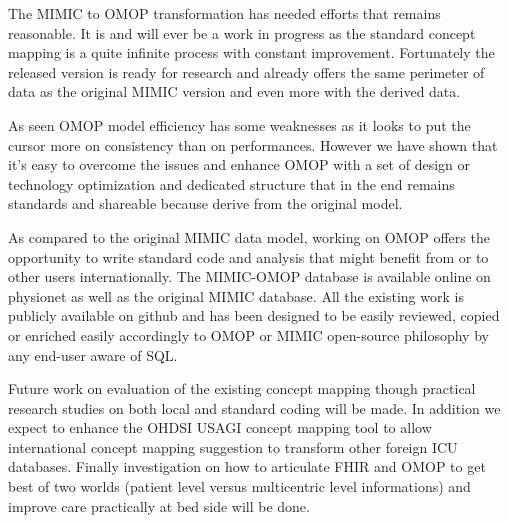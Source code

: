 The MIMIC to OMOP transformation has needed efforts that remains reasonable. It
is and will ever be a work in progress as the standard concept mapping is a
quite infinite process with constant improvement. Fortunately the released
version is ready for research and already offers the same perimeter of data as
the original MIMIC version and even more with the derived data.

As seen OMOP model efficiency has some weaknesses as it looks to put the cursor
more on consistency than on performances. However we have shown that it's easy
to overcome the issues and enhance OMOP with a set of design or technology
optimization and dedicated structure that in the end remains standards and
shareable because derive from the original model.

As compared to the original MIMIC data model, working on OMOP offers the
opportunity to write standard code and analysis that might benefit from or to
other users internationally. The MIMIC-OMOP database is available online on
physionet as well as the original MIMIC database. All the existing work is
publicly available on github \cite{mimic-omop-github} and has been designed to
be easily reviewed, copied or enriched easily accordingly to OMOP or MIMIC
open-source philosophy by any end-user aware of SQL.

Future work on evaluation of the existing concept mapping though practical
research studies on both local and standard coding will be made. In addition we
expect to enhance the OHDSI USAGI concept mapping tool to allow international
concept mapping suggestion to transform other foreign ICU databases. Finally
investigation on how to articulate FHIR and OMOP to get best of two worlds
(patient level versus multicentric level informations) and improve care
practically at bed side will be done.
